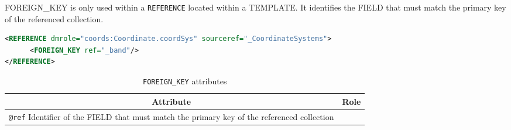 FOREIGN\_KEY is only used within a \texttt{REFERENCE} located within a TEMPLATE.
It identifies the FIELD that must  match the primary key of the referenced collection.

\begin{lstlisting}[caption={The \texttt{REFERENCE} is resolved by the \texttt{INSTANCE} of table \_CoordinateSystems that has a primary key equals to the value of the column  \_band},language=XML]
<REFERENCE dmrole="coords:Coordinate.coordSys" sourceref="_CoordinateSystems">
      <FOREIGN_KEY ref="_band"/>
</REFERENCE>
\end{lstlisting}

\begin{table}[!htbp]
\small
\centering
\begin{tabulary}{\linewidth}{|c|J|}       
       \hline 
            \textbf{Attribute} & 
            \textbf {Role}\\
       \hline         \hline  
             \texttt{@ref}  
             Identifier of the FIELD that must  match the primary key of the referenced collection & \\
     \hline
     \end{tabulary}
     \caption{\texttt{FOREIGN\_KEY} attributes} 
     \label{tbl:foreignkey-att}
 \end{table}
